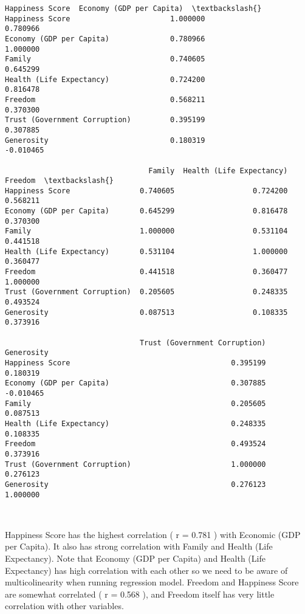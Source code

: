 \documentclass[11pt]{article}
\begin{document}
    \begin{Verbatim}[commandchars=\\\{\}]
                               Happiness Score  Economy (GDP per Capita)  \textbackslash{}
Happiness Score                       1.000000                  0.780966   
Economy (GDP per Capita)              0.780966                  1.000000   
Family                                0.740605                  0.645299   
Health (Life Expectancy)              0.724200                  0.816478   
Freedom                               0.568211                  0.370300   
Trust (Government Corruption)         0.395199                  0.307885   
Generosity                            0.180319                 -0.010465   

                                 Family  Health (Life Expectancy)   Freedom  \textbackslash{}
Happiness Score                0.740605                  0.724200  0.568211   
Economy (GDP per Capita)       0.645299                  0.816478  0.370300   
Family                         1.000000                  0.531104  0.441518   
Health (Life Expectancy)       0.531104                  1.000000  0.360477   
Freedom                        0.441518                  0.360477  1.000000   
Trust (Government Corruption)  0.205605                  0.248335  0.493524   
Generosity                     0.087513                  0.108335  0.373916   

                               Trust (Government Corruption)  Generosity  
Happiness Score                                     0.395199    0.180319  
Economy (GDP per Capita)                            0.307885   -0.010465  
Family                                              0.205605    0.087513  
Health (Life Expectancy)                            0.248335    0.108335  
Freedom                                             0.493524    0.373916  
Trust (Government Corruption)                       1.000000    0.276123  
Generosity                                          0.276123    1.000000  

    \end{Verbatim}

    \begin{center}
    \end{center}
    { \hspace*{\fill} \\}
    
    Happiness Score has the highest correlation ( r = 0.781 ) with Economic
(GDP per Capita). It also has strong correlation with Family and Health
(Life Expectancy). Note that Economy (GDP per Capita) and Health (Life
Expectancy) has high correlation with each other so we need to be aware
of multicolinearity when running regression model. Freedom and Happiness
Score are somewhat correlated ( r = 0.568 ), and Freedom itself has very
little correlation with other variables.
\end{document}
